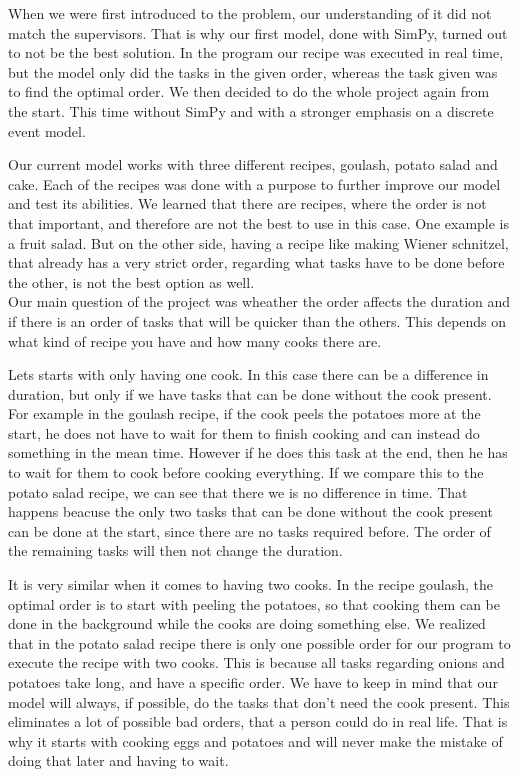 
When we were first introduced to the problem, our understanding of it did not match the supervisors.
That is why our first model, done with SimPy, turned out to not be the best solution. In the program our recipe was executed in real time, but the model only
did the tasks in the given order, whereas the task given was to find the optimal order. We then decided to do 
the whole project again from the start. This time without SimPy and with a stronger emphasis on a discrete event model. 

Our current model works with three different recipes, goulash, potato salad and cake. Each of the recipes was done with a purpose to further improve
our model and test its abilities. We learned that there are recipes, where the order is not that important, and therefore are not the best 
to use in this case. One example is a fruit salad. But on the other side, having a recipe like making Wiener schnitzel, that already has a very strict order, regarding what tasks have 
to be done before the other, is not the best option as well. \\

Our main question of the project was wheather the order affects the duration and if there is an order of tasks 
that will be quicker than the others. This depends on what kind of recipe you have and how many cooks there are. 

Lets starts with only having one cook. In this case there can be a difference in duration, but only if we have 
tasks that can be done without the cook present. For example in the goulash recipe, if the cook peels the potatoes 
more at the start, he does not have to wait for them to finish cooking and can instead do something in the mean time. 
However if he does this task at the end, then he has to wait for them to cook before cooking everything. 
If we compare this to the potato salad recipe, we can see that there we is no difference in time. That happens beacuse the only two tasks
that can be done without the cook present can be done at the start, since there are no tasks required before. 
The order of the remaining tasks will then not change the duration. 

It is very similar when it comes to having two cooks. In the recipe goulash, the optimal order is to start with 
peeling the potatoes, so that cooking them can be done in the background while the cooks are doing something else.   
We realized that in the potato salad recipe there is only one possible order for our program to execute the recipe with two cooks. 
This is because all tasks regarding onions and potatoes take long, and have a specific order. We have to keep in mind that our model will 
always, if possible, do the tasks that don't need the cook present. This eliminates a lot of possible 
bad orders, that a person could do in real life. That is why it starts with cooking eggs and potatoes and will 
never make the mistake of doing that later and having to wait. \\


